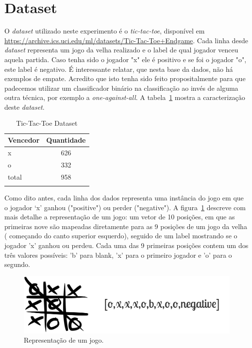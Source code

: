\section{Dataset}\label{sec:dataset}

O \emph{dataset} utilizado neste experimento é o \emph{tic-tac-toe}, disponível em \url{https://archive.ics.uci.edu/ml/datasets/Tic-Tac-Toe+Endgame}. Cada linha desde \emph{dataset} representa um jogo da velha realizado e o label de qual jogador venceu aquela partida. Caso tenha sido o jogador "x" ele é positivo e se foi o jogador "o", este label é negativo. É interessante relatar, que nesta base da dados, não há exemplos de empate. Acredito que isto tenha sido feito propositalmente para que padecemos utilizar um classificador binário na classificação ao invés  de alguma outra técnica, por exemplo a \emph{one-against-all}. A tabela~\ref{tab:dataset} mostra a caracterização deste \emph{dataset}.

\begin{table}[h!]
\centering
\begin{tabular}{lc}
\textbf{Vencedor} & \textbf{Quantidade} \\ \hline 
x        & 626       \\
o        & 332       \\
total    & 958       \\
\label{tab:dataset}
\end{tabular}
\caption{Tic-Tac-Toe Dataset}
\end{table} 


Como dito antes, cada linha dos dados representa uma instância do jogo em que o jogador `x' ganhou ("positive") ou perder ("negative"). A figura~\ref{fig:representation} descreve com mais detalhe a representação de um jogo: um vetor de 10 posições, em que as primeiras nove são mapeadas diretamente para as 9 posições de um jogo da velha ( começando do canto superior esquerdo), seguido de um label mostrando se o jogador 'x' ganhou ou perdeu. Cada uma das 9 primeiras posições contem um dos três valores possíveis: 'b' para blank, 'x' para o primeiro jogador e 'o' para o segundo.   

\begin{figure}[h]
  \includegraphics[width=\linewidth]{imgs/game_representation.png}
  \caption{Representação de um jogo.}
  \label{fig:representation}
\end{figure}
